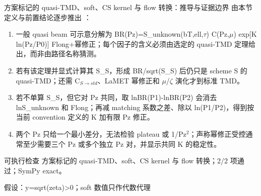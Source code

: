 \begin{frame}[t]{方案标记的 quasi-TMD、soft、CS kernel 与 flow 转换：推导与证据边界}
\footnotesize
{}\quad 由本节定义与前置结论逐步推出 ：
\begin{enumerate}
\item 一般 quasi beam 可示意分解为 BR(Pz)=S\_unknown(bT,ell,\ensuremath{\tau}) C(Pz,\ensuremath{\mu}) exp[K ln(Pz/\allowbreak{}P0)] Flong+幂修正；每个因子的含义必须由选定的 quasi-TMD 定理给出，而非由路径名称猜测。
\item 若有该定理并显式计算其 S\_S，形成 BR/\allowbreak{}sqrt(S\_S) 后仍只是 scheme S 的 quasi-TMD；还需 C\ensuremath{_{S\rightarrow{}std}}、LaMET 幂修正和 \ensuremath{\mu}/\allowbreak{}\ensuremath{\zeta} 演化才到标准 TMD。
\item 若不单算 S\_S，但它对 Pz 共同，取 lnBR(P1)-lnBR(P2) 会消去 lnS\_unknown 和 Flong；再减 matching 系数之差、除以 ln(P1/\allowbreak{}P2)，得到按当前 convention 定义的 K 加有限 Pz 修正。
\item 两个 Pz 只给一个最小差分，无法检验 plateau 或 1/\allowbreak{}Pz\ensuremath{^{2}}；声称幂修正受控通常至少需要三个 Pz 或多个独立 Pz 对，并显示共同 K 的稳定性。
\end{enumerate}\begin{block}{可执行检查}
\quad 方案标记的 quasi-TMD、soft、CS kernel 与 flow 转换；2/2 项通过；SymPy exact。
\par\scriptsize 假设：y=sqrt(zeta)>0；soft 数值只作代数代理
\end{block}
\end{frame}

